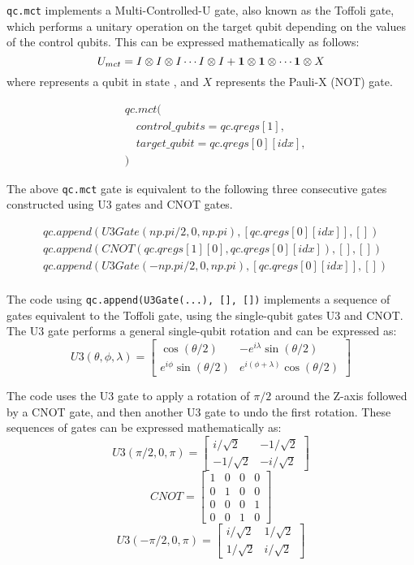 \documentclass{article}
\begin{document}
	
	
	\verb|qc.mct| implements a Multi-Controlled-U gate, also known as the Toffoli gate, which performs a unitary operation on the target qubit depending on the values of the control qubits. This can be expressed mathematically as follows:
	\[
	U_{mct} 
	= 
	I \otimes 
	I \otimes 
	I 
	\cdots 
	I \otimes 
	I + 
	\Qubit \otimes 
	\Qubit \otimes 
	\cdots 
	\Qubit \otimes 
	X
	\]        
	where \Qubit{} represents a qubit in state , and \( X \) represents the Pauli-X (NOT) gate.
	
	\begin{align*}
		& qc.mct( \\
		& \quad control\_qubits=qc.qregs[1], \\
		& \quad target\_qubit=qc.qregs[0][idx], \\
		& )
	\end{align*} 
	
	The above \verb|qc.mct| gate is equivalent to the following three consecutive gates constructed using U3 gates and CNOT gates.
	
	\begin{align*}
		& qc.append(U3Gate(np.pi/2,0,np.pi), [qc.qregs[0][idx]], []) \\ 
		& qc.append(CNOT(qc.qregs[1][0], qc.qregs[0][idx]), [], []) \\ 
		& qc.append(U3Gate(-np.pi/2,0,np.pi), [qc.qregs[0][idx]], []) \\
	\end{align*}
	
	The code using \verb|qc.append(U3Gate(...), [], [])| implements a sequence of gates equivalent to the Toffoli gate, using the single-qubit gates U3 and CNOT. The U3 gate performs a general single-qubit rotation and can be expressed as: \\
	\[
	U3(\theta, \phi, \lambda) 
	= 
	\begin{bmatrix} 
		\cos(\theta/2) 
		& -e^{i\lambda}\sin(\theta/2) 
		\\ 
		e^{i\phi}\sin(\theta/2) 
		& e^{i(\phi+\lambda)}\cos(\theta/2) 
	\end{bmatrix}
	\]
	
	The code uses the U3 gate to apply a rotation of \( \pi/2 \) around the Z-axis followed by a CNOT gate, and then another U3 gate to undo the first rotation. These sequences of gates can be expressed mathematically as: \\
	\[
	U3(\pi/2, 0, \pi) 
	= 
	\begin{bmatrix} 
		i/\sqrt{2} 
		& -1/\sqrt{2} 
		\\ 
		-1/\sqrt{2} 
		& -i/\sqrt{2} 
	\end{bmatrix}
	\]
	\[
	CNOT 
	= 
	\begin{bmatrix} 
		1 & 0 & 0 & 0 \\ 
		0 & 1 & 0 & 0 \\ 
		0 & 0 & 0 & 1 \\ 
		0 & 0 & 1 & 0 
	\end{bmatrix}
	\]
	\[
	U3(-\pi/2, 0, \pi) 
	= 
	\begin{bmatrix} 
		i/\sqrt{2} 
		& 1/\sqrt{2} 
		\\ 
		1/\sqrt{2} 
		& i/\sqrt{2} 
	\end{bmatrix}
	\]
	
\end{document}
